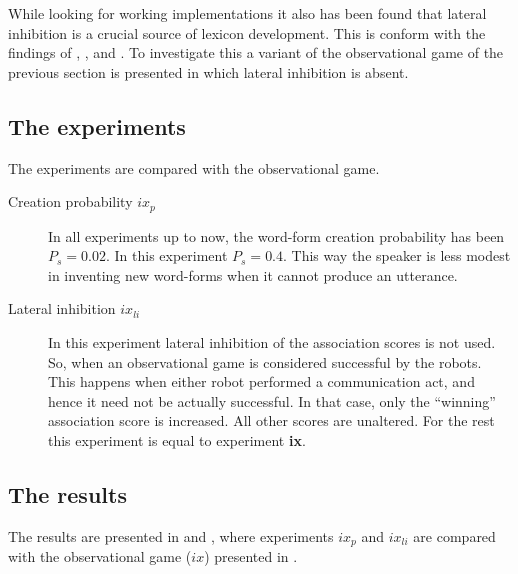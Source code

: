 While looking for working implementations it also has been found that lateral inhibition is a crucial source of lexicon development. This is conform with the findings of \citet{oliphant:1997}, \citet{steels:2000}, \citet{dejong:2000} and \citet{kaplan:2000}. To investigate this a variant of the observational game of the previous section is presented in which lateral inhibition is absent.

\subsection{The experiments}\label{sec:para:experiments}

The experiments are compared with the observational game.

\begin{description}
\item[Creation probability $ix_p$] In all experiments up to now, the word-form creation probability has been $P_s=0.02$. In this experiment $P_s=0.4$. This way the speaker is less modest in inventing new word-forms when it cannot produce an utterance. 
\item[Lateral inhibition $ix_{li}$] In this experiment lateral inhibition of the association scores is not used. So, when an observational game is considered successful by the robots. This happens when either robot performed a communication act, and hence it need not be actually successful. In that case, only the ``winning'' association score is increased. All other scores are unaltered. For the rest this experiment is equal to experiment {\bf ix}. 
\end{description}

\subsection{The results}

The results are presented in  and , where experiments $ix_p$ and $ix_{li}$ are compared with the observational game ($ix$) presented in .


